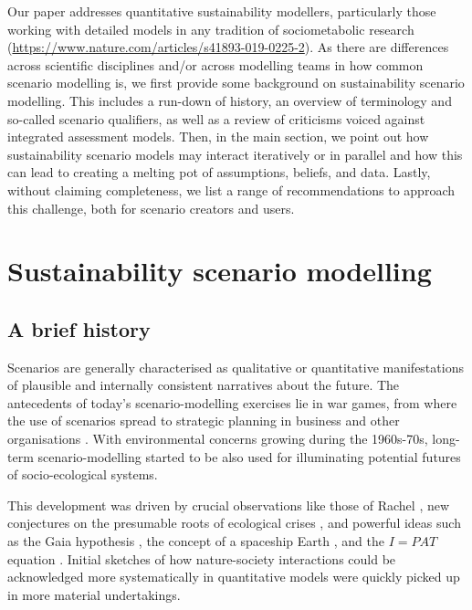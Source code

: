 \documentclass{article}
\begin{document}
\begin{refsection}
Our paper addresses quantitative sustainability modellers, particularly those working with detailed models in any tradition of sociometabolic research (\url{https://www.nature.com/articles/s41893-019-0225-2}). 
As there are differences across scientific disciplines and/or across modelling teams in how common scenario modelling is, we first provide some background on sustainability scenario modelling. 
This includes a run-down of history, an overview of terminology and so-called scenario qualifiers, as well as a review of criticisms voiced against integrated assessment models.
Then, in the main section, we point out how sustainability scenario models may interact iteratively or in parallel and how this can lead to creating a melting pot of assumptions, beliefs, and data.
Lastly, without claiming completeness, we list a range of recommendations to approach this challenge, both for scenario creators and users.


\section{Sustainability scenario modelling}

\subsection{A brief history}

Scenarios are generally characterised as qualitative or quantitative manifestations of plausible and internally consistent narratives about the future. 
The antecedents of today's scenario-modelling exercises lie in war games, from where the use of scenarios spread to strategic planning in business and other organisations \parencite{bradfield_2005,schoemaker_1993}. 
With environmental concerns growing during the 1960s-70s, long-term scenario-modelling started to be also used for illuminating potential futures of socio-ecological systems.

This development was driven by crucial observations like those of Rachel \textcite{carson_1962}, new conjectures on the presumable roots of ecological crises \parencite{white_1967}, and powerful ideas such as the Gaia hypothesis \parencite{lovelock_1972,lovelock_1974}, the concept of a spaceship Earth \parencite{boulding_1966}, and the $I=PAT$ equation \parencite{ehrlich_1972,commoner_1972,chertow_2001}. 
Initial sketches of how nature-society interactions could be acknowledged more systematically in quantitative models \parencite{daly_1968,isard_1968,cumberland_1966,ayres_kneese_1969} were quickly picked up in more material undertakings.


\end{refsection}
\end{document}
